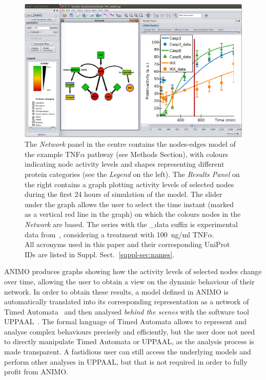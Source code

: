 \documentclass{bmcart}
\begin{document}
\begin{figure}[htbp]
\begin{center}
  \includegraphics[width=.85\textwidth]{Figures/1}
\end{center}
\caption{
The \emph{Network} panel in the centre contains the nodes-edges
model of the example TNF$\alpha$ pathway (see Methods Section), with
colours indicating node activity levels and shapes representing different protein categories (see the \emph{Legend} on the left).
The \emph{Results Panel} on the right contains a graph plotting activity levels of selected nodes
during the first 24 hours of simulation of the model. The slider under the graph
allows the user to select the time instant (marked as a vertical red line in the graph) on which
the colours nodes in the \emph{Network} are based.
The series with the {\sf \_data} suffix is experimental
data from~\cite{pathway-compendium}, considering a treatment with 100~ng/ml TNF$\alpha$.\\
All acronyms used in this paper
and their corresponding UniProt IDs are listed in Suppl. Sect.~\ref{suppl-sec:names}.
\label{fig:cytoscape}}
\end{figure}


ANIMO produces graphs showing how the activity levels of selected nodes
change over time, allowing the user to obtain a view on the dynamic behaviour of their network.
In order to obtain these results, a model defined in ANIMO is automatically translated into
its corresponding representation as a network of Timed Automata~\cite{timed-automata-alur-dill}
and then analysed \emph{behind the scenes} with the software tool UPPAAL~\cite{uppaal}.
The formal language of Timed Automata allows to represent and analyse complex behaviours precisely and efficiently,
but the user does not need to directly manipulate Timed Automata or UPPAAL, as the analysis process is made transparent.
A fastidious user can still access the underlying models and perform other analyses in UPPAAL,
but that is not required in order to fully profit from ANIMO.
\end{document}
